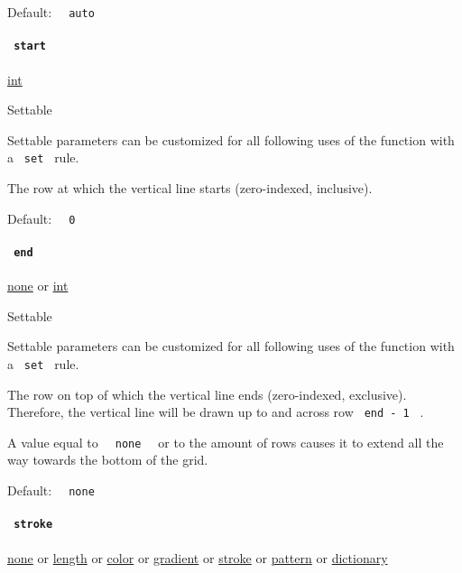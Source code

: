 Default: \texttt{\ }{\texttt{\ auto\ }}\texttt{\ }

\paragraph{\texorpdfstring{\texttt{\ start\ }}{ start }}\label{definitions-vline-start}

\href{/docs/reference/foundations/int/}{int}

{{ Settable }}

\label{definitions-vline-start-settable-tooltip}
Settable parameters can be customized for all following uses of the
function with a \texttt{\ set\ } rule.

The row at which the vertical line starts (zero-indexed, inclusive).

Default: \texttt{\ }{\texttt{\ 0\ }}\texttt{\ }

\paragraph{\texorpdfstring{\texttt{\ end\ }}{ end }}\label{definitions-vline-end}

\href{/docs/reference/foundations/none/}{none} {or}
\href{/docs/reference/foundations/int/}{int}

{{ Settable }}

\label{definitions-vline-end-settable-tooltip}
Settable parameters can be customized for all following uses of the
function with a \texttt{\ set\ } rule.

The row on top of which the vertical line ends (zero-indexed,
exclusive). Therefore, the vertical line will be drawn up to and across
row \texttt{\ end\ -\ 1\ } .

A value equal to \texttt{\ }{\texttt{\ none\ }}\texttt{\ } or to the
amount of rows causes it to extend all the way towards the bottom of the
grid.

Default: \texttt{\ }{\texttt{\ none\ }}\texttt{\ }

\paragraph{\texorpdfstring{\texttt{\ stroke\ }}{ stroke }}\label{definitions-vline-stroke}

\href{/docs/reference/foundations/none/}{none} {or}
\href{/docs/reference/layout/length/}{length} {or}
\href{/docs/reference/visualize/color/}{color} {or}
\href{/docs/reference/visualize/gradient/}{gradient} {or}
\href{/docs/reference/visualize/stroke/}{stroke} {or}
\href{/docs/reference/visualize/pattern/}{pattern} {or}
\href{/docs/reference/foundations/dictionary/}{dictionary}

